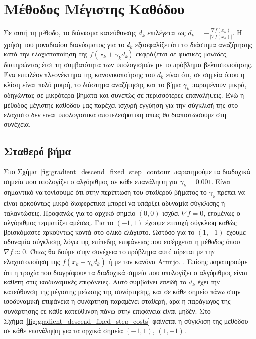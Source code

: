 \documentclass[a4paper,12pt]{article}
\begin{document}
\section*{Μέθοδος Μέγιστης Καθόδου}
Σε αυτή τη μέθοδο, το διάνυσμα κατεύθυνσης $d_k$ επιλέγεται ως $d_k = -\frac{\nabla f(x_k)}{|\nabla f(x_k)|}$.
Η χρήση του μοναδιαίου διανύσματος για το $d_k$ εξασφαλίζει ότι το διάστημα αναζήτησης κατά την ελαχιστοποίηση της $f(x_k + \gamma_k d_k)$ εκφράζεται σε φυσικές μονάδες, διατηρώντας έτσι τη συμβατότητα των υπολογισμών με το 
πρόβλημα βελτιστοποίησης. Ένα επιπλέον πλεονέκτημα της κανονικοποίησης του $d_k$ είναι ότι, σε σημεία όπου η 
κλίση είναι πολύ μικρή, το διάστημα αναζήτησης και το βήμα $\gamma_k$ παραμένουν μικρά, οδηγώντας σε μικρότερα 
βήματα και συνεπώς σε περισσότερες επαναλήψεις. Ενώ η μέθοδος μέγιστης καθόδου μας παρέχει ισχυρή εγγύηση για την
σύγκλισή της στο ελάχιστο δεν είναι υπολογιστικά αποτελεσματική όπως θα διαπιστώσουμε στη συνέχεια.

\subsection*{Σταθερό βήμα}
Στο Σχήμα~\ref{fig:gradient_descend_fixed_step_contour} παρατηρούμε τα διαδοχικά σημεία που υπολογίζει ο αλγόριθμος
σε κάθε επανάληψη για $\gamma_k = 0.001$. Είναι σημαντικό να τονίσουμε ότι στην περίπτωση του σταθερού βήματος 
το $\gamma_k$ πρέπει να είναι αρκούντως μικρό διαφορετικά μπορεί να υπάρξει αδυναμία σύγκλισης ή ταλαντώσεις.
Προφανώς για το αρχικό σημείο $(0,0)$ ισχύει $\nabla f = 0$, επομένως ο αλγόριθμος τερματίζει αμέσως.
Για το $(-1, 1)$ έχουμε επιτυχή σύγκλιση καθώς βρισκόμαστε αρκούντως κοντά στο ολικό ελάχιστο. Ωστόσο για το
$(1, -1)$ έχουμε αδυναμία σύγκλισης λόγω της επίπεδης επιφάνειας που εισέρχεται η μέθοδος όπου $\nabla f \approx 0$.
Όπως θα δούμε στην συνέχεια το πρόβλημα αυτό αίρεται με την ελαχιστοποίηση της $f(x_k + \gamma_k d_k)$ ή 
με τον κανόνα  Armijo. . Επίσης παρατηρούμε ότι η τροχία που
διαγράφουν τα διαδοχικά σημεία που υπολογίζει ο αλγόριθμος είναι κάθετη στις ισοδυναμικές επιφάνειες. Αυτό
συμβαίνει επειδή το $d_k$ έχει την κατεύθυνση της μέγιστης μείωσης της συνάρτησης, και σε κάθε σημείο πάνω στην 
ισοδυναμική επιφάνεια η συνάρτηση παραμένει σταθερή, άρα η παράγωγος της συνάρτησης σε κάθε κατεύθυνση πάνω στην
επιφάνεια είναι μηδέν. Στο Σχήμα~\ref{fig:gradient_descend_fixed_step_costs} φαίνεται η σύγκλιση της μεθόδου
σε κάθε επανάληψη για τα αρχικά σημεία $(-1, 1)$, $(1, -1)$.
\end{document}
